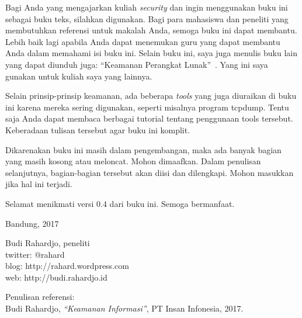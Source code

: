 Bagi Anda yang mengajarkan kuliah {\em security} dan ingin menggunakan
buku ini sebagai buku teks, silahkan digunakan.
Bagi para mahasiswa dan peneliti yang membutuhkan referensi untuk
makalah Anda, semoga buku ini dapat membantu.
Lebih baik lagi apabila Anda dapat menemukan guru yang dapat membantu Anda
dalam memahami isi buku ini.
Selain buku ini, saya juga menulis buku lain yang dapat diunduh juga:
``Keamanan Perangkat Lunak''~\cite{BRsecuresoftware}.
Yang ini saya gunakan untuk kuliah saya yang lainnya.

Selain prinsip-prinsip keamanan, ada beberapa {\em tools} yang juga diuraikan
di buku ini karena mereka sering digunakan, seperti misalnya program tcpdump.
Tentu saja Anda dapat membaca berbagai tutorial tentang penggunaan tools
tersebut. Keberadaan tulisan tersebut agar buku ini komplit.

Dikarenakan buku ini masih dalam pengembangan, maka ada banyak bagian yang
masih kosong atau meloncat. Mohon dimaafkan. Dalam penulisan selanjutnya,
bagian-bagian tersebut akan diisi dan dilengkapi. Mohon masukkan jika hal ini
terjadi.

Selamat menikmati versi 0.4 dari buku ini. Semoga bermanfaat.
\vspace{5 mm}

Bandung, 2017


Budi Rahardjo, peneliti\\
twitter: @rahard\\
blog: http://rahard.wordpress.com\\
web: http://budi.rahardjo.id

\vspace{5 mm}
Penulisan referensi:\\
Budi Rahardjo, {\em ``Keamanan Informasi''}, PT Insan Infonesia, 2017.

\doclicenseThis
